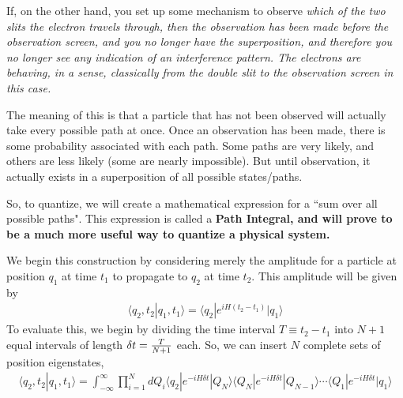 \documentclass[12pt,epsf]{article}
\def\nolabel{\nonumber }
\def\nolabel{\nonumber }
\begin{document}
If, on the other hand, you set up some mechanism to observe \it which
\rm of the two slits the electron travels through, then the observation
has been made \it before \rm the observation screen, and you no longer
have the superposition, and therefore you no longer see any indication
of an interference pattern.  The electrons are behaving, in a sense,
classically from the double slit to the observation screen in this
case.  

The meaning of this is that a particle that has not been observed will
actually take every possible path at once.  Once an observation has
been made, there is some probability associated with each path.  Some
paths are very likely, and others are less likely (some are nearly
impossible).  But until observation, it actually exists in a
superposition of all possible states/paths.

So, to quantize, we will create a mathematical expression for a ``sum
over all possible paths".  This expression is called a \bf Path
Integral\rm, and will prove to be a much more useful way to quantize a
physical system.  

We begin this construction by considering merely the amplitude for a
particle at position $q_1$ at time $t_1$ to propagate to $q_2$ at time
$t_2$.	This amplitude will be given by 
\begin{eqnarray}
\langle q_2,t_2|q_1,t_1\rangle = \langle
q_2|e^{iH(t_2-t_1)}|q_1\rangle\nolabel
\end{eqnarray}
To evaluate this, we begin by dividing the time interval $T \equiv
t_2-t_1$ into $N+1$ equal intervals of length $\delta t = {T \over
N+1}$ each.  So, we can insert $N$ complete sets of position
eigenstates,
\begin{eqnarray}
\langle q_2,t_2|q_1,t_1\rangle = \int_{-\infty}^{\infty}
\prod_{i=1}^NdQ_i\langle q_2|e^{-iH\delta t}|Q_N\rangle \langle
Q_N|e^{-iH\delta t}|Q_{N-1}\rangle \cdots \langle Q_1|e^{-iH\delta
t}|q_1\rangle \label{eq:firstpathintegral}
\end{eqnarray}
\end{document}
